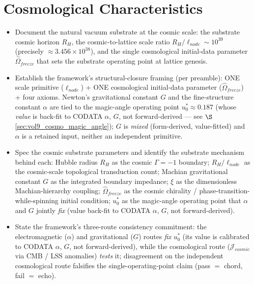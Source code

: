 \chapter{Cosmological Characteristics}
\label{ch:vol9_cosmological_characteristics}

\begin{objectivebox}
\begin{itemize}
    \item Document the natural vacuum substrate at the cosmic scale: the substrate cosmic horizon $R_H$, the cosmic-to-lattice scale ratio $R_H / \ell_{node} \sim 10^{39}$ (precisely $\approx 3.456\times10^{38}$), and the single cosmological initial-data parameter $\hat{\Omega}_{freeze}$ that sets the substrate operating point at lattice genesis.
    \item Establish the framework's structural-closure framing (per  preamble): ONE scale primitive ($\ell_{node}$) + ONE cosmological initial-data parameter ($\hat{\Omega}_{freeze}$) + four axioms. Newton's gravitational constant $G$ and the fine-structure constant $\alpha$ are tied to the magic-angle operating point $u_0^* \approx 0.187$ (whose \emph{value} is back-fit to CODATA $\alpha$, $G$, not forward-derived --- see $\S$\ref{sec:vol9_cosmo_magic_angle}); $G$ is \emph{mixed} (form-derived, value-fitted) and $\alpha$ is a retained input, neither an independent primitive.
    \item Spec the cosmic substrate parameters and identify the substrate mechanism behind each: Hubble radius $R_H$ as the cosmic $\Gamma = -1$\gammaundeclared{} boundary; $R_H/\ell_{node}$ as the cosmic-scale topological transduction count; Machian gravitational constant $G$ as the integrated boundary impedance; $\xi$ as the dimensionless Machian-hierarchy coupling; $\hat{\Omega}_{freeze}$ as the cosmic chirality / phase-transition-while-spinning initial condition; $u_0^*$ as the magic-angle operating point that $\alpha$ and $G$ jointly \emph{fix} (value back-fit to CODATA $\alpha$, $G$, not forward-derived).
    \item State the framework's three-route consistency commitment: the electromagnetic ($\alpha$) and gravitational ($G$) routes \emph{fix} $u_0^*$ (its value is calibrated to CODATA $\alpha$, $G$, not forward-derived), while the cosmological route ($\mathcal{J}_{cosmic}$ via CMB / LSS anomalies) \emph{tests} it; disagreement on the independent cosmological route falsifies the single-operating-point claim (pass $=$ chord, fail $=$ echo).

\end{itemize}
\end{objectivebox}

